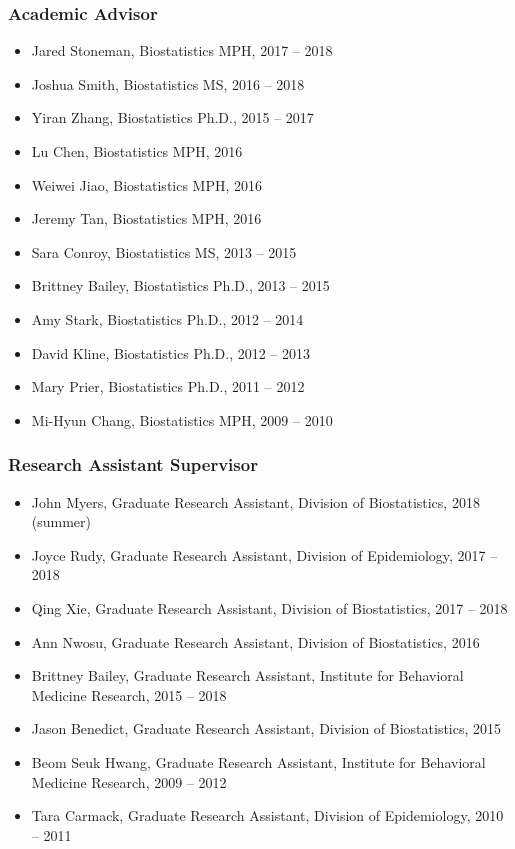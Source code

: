\documentclass[
  english,
  letterpaper,
  DIV=11,
  numbers=noendperiod]{scrartcl}
\providecommand{\tightlist}{%
  \setlength{\itemsep}{0pt}\setlength{\parskip}{0pt}}
\begin{document}
\subsubsection{Academic Advisor}\label{academic-advisor}

\begin{itemize}
\tightlist
\item
  Jared Stoneman, Biostatistics MPH, 2017 -- 2018
\item
  Joshua Smith, Biostatistics MS, 2016 -- 2018
\item
  Yiran Zhang, Biostatistics Ph.D., 2015 -- 2017
\item
  Lu Chen, Biostatistics MPH, 2016
\item
  Weiwei Jiao, Biostatistics MPH, 2016
\item
  Jeremy Tan, Biostatistics MPH, 2016
\item
  Sara Conroy, Biostatistics MS, 2013 -- 2015
\item
  Brittney Bailey, Biostatistics Ph.D., 2013 -- 2015
\item
  Amy Stark, Biostatistics Ph.D., 2012 -- 2014
\item
  David Kline, Biostatistics Ph.D., 2012 -- 2013
\item
  Mary Prier, Biostatistics Ph.D., 2011 -- 2012
\item
  Mi-Hyun Chang, Biostatistics MPH, 2009 -- 2010
\end{itemize}

\subsubsection{Research Assistant
Supervisor}\label{research-assistant-supervisor}

\begin{itemize}
\tightlist
\item
  John Myers, Graduate Research Assistant, Division of Biostatistics,
  2018 (summer)
\item
  Joyce Rudy, Graduate Research Assistant, Division of Epidemiology,
  2017 -- 2018
\item
  Qing Xie, Graduate Research Assistant, Division of Biostatistics, 2017
  -- 2018
\item
  Ann Nwosu, Graduate Research Assistant, Division of Biostatistics,
  2016
\item
  Brittney Bailey, Graduate Research Assistant, Institute for Behavioral
  Medicine Research, 2015 -- 2018
\item
  Jason Benedict, Graduate Research Assistant, Division of
  Biostatistics, 2015
\item
  Beom Seuk Hwang, Graduate Research Assistant, Institute for Behavioral
  Medicine Research, 2009 -- 2012
\item
  Tara Carmack, Graduate Research Assistant, Division of Epidemiology,
  2010 -- 2011
\end{itemize}
\end{document}
